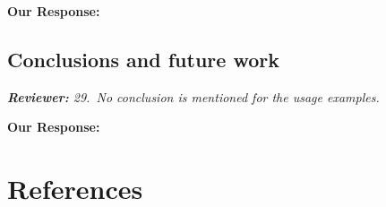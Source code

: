 \documentclass[a4paper,10pt]{elsarticle}
\newenvironment{reviewer}{\vspace{0.5\baselineskip}\begingroup\itshape\textbf{Reviewer:}}{\endgroup\vspace{0.5\baselineskip}}
\newenvironment{response}{\vspace{0.5\baselineskip}\textbf{Our Response:}}{\vspace{0.5\baselineskip}}
\begin{document}
\begin{response}

\end{response}

\subsection*{Conclusions and future work}

\begin{reviewer}
    29.~No conclusion is mentioned for the usage examples.
\end{reviewer}

\begin{response}

\end{response}

\section*{References}


\end{document}
